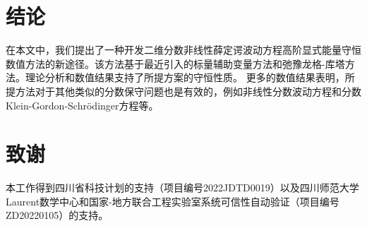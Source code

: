 	\section{结论}\label{Section 7}
	在本文中，我们提出了一种开发二维分数非线性薛定谔波动方程高阶显式能量守恒数值方法的新途径。该方法基于最近引入的标量辅助变量方法和弛豫龙格-库塔方法。理论分析和数值结果支持了所提方案的守恒性质。
	更多的数值结果表明，所提方法对于其他类似的分数保守问题也是有效的，例如非线性分数波动方程和分数Klein-Gordon-Schr{\"o}dinger方程等。
	
	\section*{致谢}
	本工作得到四川省科技计划的支持（项目编号2022JDTD0019）以及四川师范大学Laurent数学中心和国家-地方联合工程实验室系统可信性自动验证（项目编号ZD20220105）的支持。	
	


